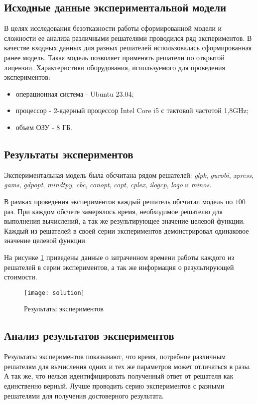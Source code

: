 \subsection*{Исходные данные экспериментальной модели}
В целях исследования безотказности работы сформированной модели и сложности ее анализа различными решателями проводился ряд экспериментов. В качестве входных данных для разных решателей использовалась сформированная ранее модель. Такая модель позволяет применять решатели по открытой лицензии.
Характеристики оборудования, используемого для проведения экспериментов:
\begin{itemize}
  \item операционная система - Ubuntu 23.04;
  \item процессор - 2-ядерный процессор Intel Core i5 с тактовой частотой 1,8GHz;
  \item объем ОЗУ - 8 ГБ.
\end{itemize}

\subsection*{Результаты экспериментов}
Экспериментальная модель была обсчитана рядом решателей: \textit{glpk}, \textit{gurobi}, \textit{xpress}, \textit{gams}, \textit{gdpopt}, \textit{mindtpy}, \textit{cbc}, \textit{conopt}, \textit{copt}, \textit{cplex}, \textit{ilogcp}, \textit{loqo} и \textit{minos}.

В рамках проведения экспериментов каждый решатель обсчитал модель по $100$ раз. При каждом обсчете замерялось время, необходимое решателю для выполнения вычислений, а так же результирующее значение целевой функции. Каждый из решателей в своей серии экспериментов демонстрировал одинаковое значение целевой функции.

На рисунке \ref{fig:solution} приведены данные о затраченном времени работы каждого из решателей в серии экспериментов, а так же информация о результирующей стоимости.

\begin{figure}[H]
  \centering
  \texttt{[image: solution]}
  \caption{Результаты экспериментов}
  \label{fig:solution}
\end{figure}

\subsection*{Анализ результатов экспериментов}
Результаты экспериментов показывают, что время, потребное различным решателям для вычисления одних и тех же параметров может отличаться в разы. А так же, что нельзя идентифицировать полученный ответ от решателя как единственно верный. Лучше проводить серию экспериментов с разными решателями для получения достоверного результата.

